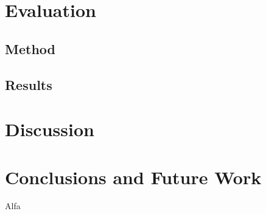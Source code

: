 \documentclass[final,5p,times,twocolumn]{elsarticle}
\begin{document}
\section{Evaluation}
\label{sec:evaluation}


\subsection{Method}
\label{sec:method}

\subsection{Results}
\label{sec:Results}

\section{Discussion}
\label{sec:discussion}


\section{Conclusions and Future Work}
\label{sec:conclusions_and_future_work}

Alfa \cite{cormen2009introduction}




   
  


%
%
%
\end{document}

